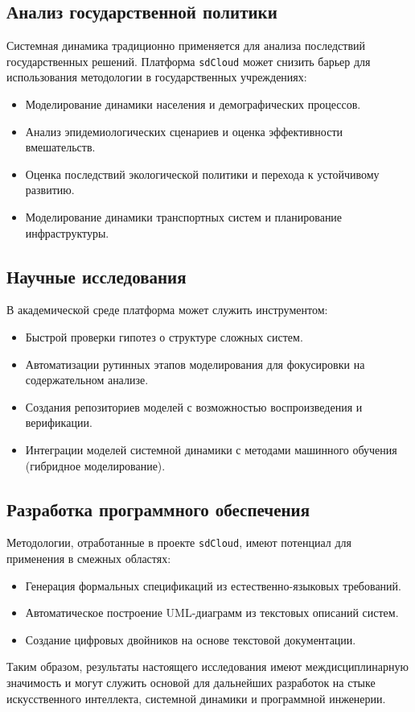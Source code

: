 \subsection{Анализ государственной политики}

Системная динамика традиционно применяется для анализа последствий государственных решений. Платформа \texttt{sdCloud} может снизить барьер для использования методологии в государственных учреждениях:

\begin{itemize}
    \item Моделирование динамики населения и демографических процессов.
    \item Анализ эпидемиологических сценариев и оценка эффективности вмешательств.
    \item Оценка последствий экологической политики и перехода к устойчивому развитию.
    \item Моделирование динамики транспортных систем и планирование инфраструктуры.
\end{itemize}

\subsection{Научные исследования}

В академической среде платформа может служить инструментом:

\begin{itemize}
    \item Быстрой проверки гипотез о структуре сложных систем.
    \item Автоматизации рутинных этапов моделирования для фокусировки на содержательном анализе.
    \item Создания репозиториев моделей с возможностью воспроизведения и верификации.
    \item Интеграции моделей системной динамики с методами машинного обучения (гибридное моделирование).
\end{itemize}

\subsection{Разработка программного обеспечения}

Методологии, отработанные в проекте \texttt{sdCloud}, имеют потенциал для применения в смежных областях:

\begin{itemize}
    \item Генерация формальных спецификаций из естественно-языковых требований.
    \item Автоматическое построение UML-диаграмм из текстовых описаний систем.
    \item Создание цифровых двойников на основе текстовой документации.
\end{itemize}

Таким образом, результаты настоящего исследования имеют междисциплинарную значимость и могут служить основой для дальнейших разработок на стыке искусственного интеллекта, системной динамики и программной инженерии.
